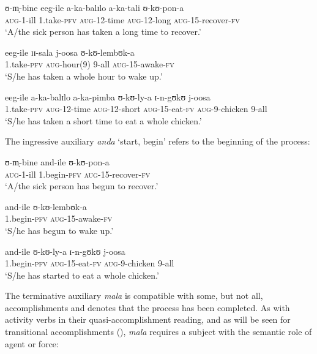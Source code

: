 \begin{exe}
\ex
\begin{xlist}
\ex \gll ʊ-m̩-bine eeg-ile a-ka-balɪlo a-ka-tali ʊ-kʊ-pon-a\\
\textsc{aug}-1-ill 1.take-\textsc{pfv} \textsc{aug}-12-time \textsc{aug}-12-long \textsc{aug}-15-recover-\textsc{fv}\\
\glt \lq A/the sick person has taken a long time to recover.'

\ex \gll eeg-ile ɪɪ-sala j-oosa ʊ-kʊ-lembʊk-a\\
1.take-\textsc{pfv} \textsc{aug}-hour(9) 9-all \textsc{aug}-15-awake-\textsc{fv}\\
\glt \lq S/he has taken a whole hour to wake up.'

\ex \gll eeg-ile a-ka-balɪlo a-ka-pimba ʊ-kʊ-ly-a ɪ-n-gʊkʊ j-oosa\\
1.take-\textsc{pfv} \textsc{aug}-12-time \textsc{aug}-12-short \textsc{aug}-15-eat-\textsc{fv} \textsc{aug}-9-chicken 9-all\\
\glt \lq S/he has taken a short time to eat a whole chicken.'
\end{xlist}
\end{exe}

The ingressive auxiliary \textit{anda} \lq start, begin' refers to the beginning of the process:
\begin{exe}
\ex\begin{xlist}
\ex \gll ʊ-m̩-bine and-ile ʊ-kʊ-pon-a\\
\textsc{aug}-1-ill 1.begin-\textsc{pfv} \textsc{aug}-15-recover-\textsc{fv}\\
\glt \lq A/the sick person has begun to recover.'

\ex \gll and-ile ʊ-kʊ-lembʊk-a\\
1.begin-\textsc{pfv} \textsc{aug}-15-awake-\textsc{fv}\\
\glt \lq S/he has begun to wake up.'

\ex \gll and-ile ʊ-kʊ-ly-a ɪ-n-gʊkʊ j-oosa\\
1.begin-\textsc{pfv} \textsc{aug}-15-eat-\textsc{fv} \textsc{aug}-9-chicken 9-all\\
\glt \lq S/he has started to eat a whole chicken.'
\end{xlist}
\end{exe}
The terminative auxiliary \textit{mala} is compatible with some, but not all, accomplishments and denotes that the process has been completed. As with activity verbs in their quasi-accomplishment reading, and as will be seen for transitional accomplishments (), \textit{mala} requires a subject with the semantic role of agent or force:

